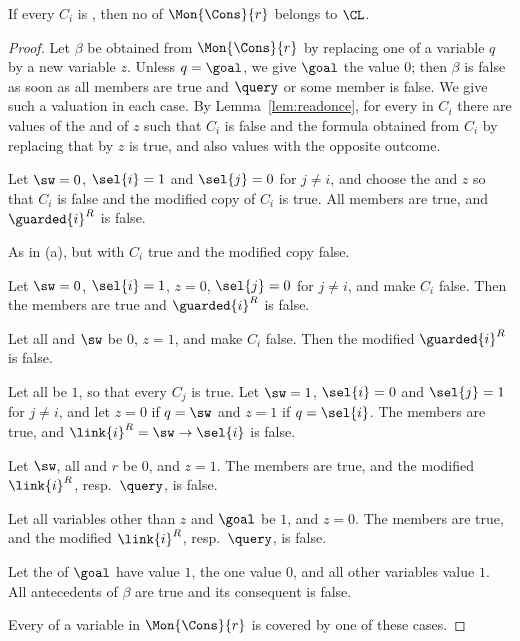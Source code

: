 \begin{lemma}\label{lem:F-sep}
If every $C_i$ is , then no  of
$\Mon{\Cons}{r}$ belongs to $\CL$.
\end{lemma}
\begin{proof}
Let $\beta$ be obtained from $\Mon{\Cons}{r}$ by replacing one
 of a variable $q$ by a new variable $z$. Unless $q=\goal$,
we give $\goal$ the value $0$; then $\beta$ is false as soon as all
 members are true and $\query$ or some  member is false.
We give such a valuation in each case. By Lemma~\ref{lem:readonce}, for
every  in $C_i$ there are values of the 
and of $z$ such that $C_i$ is false and the formula obtained from $C_i$ by
replacing that  by $z$ is true, and also values with the
opposite outcome.

Let $\sw=0$, $\sel{i}=1$ and $\sel{j}=0$ for $j\ne i$, and choose the
 and $z$ so that $C_i$ is false and the modified
 copy of $C_i$ is true. All  members are true, and
$\guarded{i}^R$ is false.

As in (a), but with $C_i$ true and the modified  copy false.

Let $\sw=0$, $\sel{i}=1$, $z=0$, $\sel{j}=0$ for $j\ne i$, and make $C_i$
false. Then the  members are true and $\guarded{i}^R$ is false.

Let all  and $\sw$ be $0$, $z=1$, and make $C_i$ false. Then
the modified $\guarded{i}^R$ is false.

Let all  be $1$, so that every $C_j$ is true. Let
$\sw=1$, $\sel{i}=0$ and $\sel{j}=1$ for $j\ne i$, and let $z=0$ if $q=\sw$
and $z=1$ if $q=\sel{i}$. The  members are true, and
$\link{i}^R=\sw\to\sel{i}$ is false.

Let $\sw$, all  and $r$ be $0$, and $z=1$. The 
members are true, and the modified $\link{i}^R$, resp.\ $\query$, is
false.

Let all variables other than $z$ and $\goal$ be $1$, and $z=0$. The
 members are true, and the modified $\link{i}^R$, resp.\ $\query$,
is false.

Let the   of $\goal$ have value $1$, the
 one value $0$, and all other variables value $1$. All
antecedents of $\beta$ are true and its consequent is false.

Every  of a variable in $\Mon{\Cons}{r}$ is covered by one of
these cases.
\end{proof}


